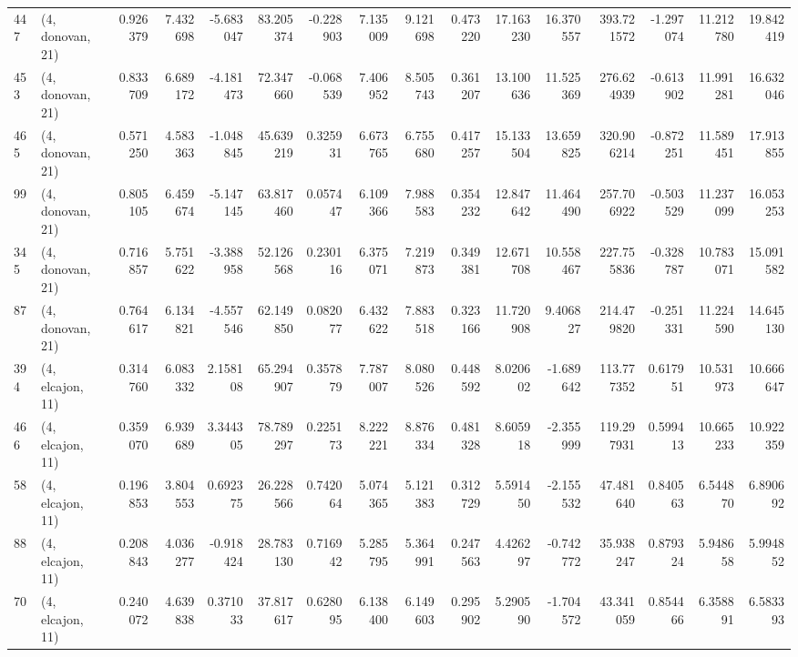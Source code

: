 \begin{tabular}{llrrrrrrrrrrrrrr}
447 &  (4, donovan, 21) &   0.926379 &   7.432698 &  -5.683047 &    83.205374 &  -0.228903 &   7.135009 &   9.121698 &  0.473220 &  17.163230 &  16.370557 &   393.721572 &  -1.297074 &  11.212780 &  19.842419 \\
453 &  (4, donovan, 21) &   0.833709 &   6.689172 &  -4.181473 &    72.347660 &  -0.068539 &   7.406952 &   8.505743 &  0.361207 &  13.100636 &  11.525369 &   276.624939 &  -0.613902 &  11.991281 &  16.632046 \\
465 &  (4, donovan, 21) &   0.571250 &   4.583363 &  -1.048845 &    45.639219 &   0.325931 &   6.673765 &   6.755680 &  0.417257 &  15.133504 &  13.659825 &   320.906214 &  -0.872251 &  11.589451 &  17.913855 \\
99  &  (4, donovan, 21) &   0.805105 &   6.459674 &  -5.147145 &    63.817460 &   0.057447 &   6.109366 &   7.988583 &  0.354232 &  12.847642 &  11.464490 &   257.706922 &  -0.503529 &  11.237099 &  16.053253 \\
345 &  (4, donovan, 21) &   0.716857 &   5.751622 &  -3.388958 &    52.126568 &   0.230116 &   6.375071 &   7.219873 &  0.349381 &  12.671708 &  10.558467 &   227.755836 &  -0.328787 &  10.783071 &  15.091582 \\
87  &  (4, donovan, 21) &   0.764617 &   6.134821 &  -4.557546 &    62.149850 &   0.082077 &   6.432622 &   7.883518 &  0.323166 &  11.720908 &   9.406827 &   214.479820 &  -0.251331 &  11.224590 &  14.645130 \\
394 &  (4, elcajon, 11) &   0.314760 &   6.083332 &   2.158108 &    65.294907 &   0.357879 &   7.787007 &   8.080526 &  0.448592 &   8.020602 &  -1.689642 &   113.777352 &   0.617951 &  10.531973 &  10.666647 \\
466 &  (4, elcajon, 11) &   0.359070 &   6.939689 &   3.344305 &    78.789297 &   0.225173 &   8.222221 &   8.876334 &  0.481328 &   8.605918 &  -2.355999 &   119.297931 &   0.599413 &  10.665233 &  10.922359 \\
58  &  (4, elcajon, 11) &   0.196853 &   3.804553 &   0.692375 &    26.228566 &   0.742064 &   5.074365 &   5.121383 &  0.312729 &   5.591450 &  -2.155532 &    47.481640 &   0.840563 &   6.544870 &   6.890692 \\
88  &  (4, elcajon, 11) &   0.208843 &   4.036277 &  -0.918424 &    28.783130 &   0.716942 &   5.285795 &   5.364991 &  0.247563 &   4.426297 &  -0.742772 &    35.938247 &   0.879324 &   5.948658 &   5.994852 \\
70  &  (4, elcajon, 11) &   0.240072 &   4.639838 &   0.371033 &    37.817617 &   0.628095 &   6.138400 &   6.149603 &  0.295902 &   5.290590 &  -1.704572 &    43.341059 &   0.854466 &   6.358891 &   6.583393 \\

\end{tabular}
